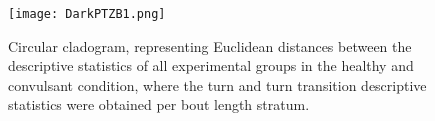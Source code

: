 \begin{figure}[h!]
\begin{center}
\texttt{[image: DarkPTZB1.png]}
\caption{Circular cladogram, representing Euclidean distances between the descriptive statistics of all experimental groups in the healthy and convulsant condition, where the turn and turn transition descriptive statistics were obtained per bout length stratum.}
\end{center}
\end{figure}
\newpage
